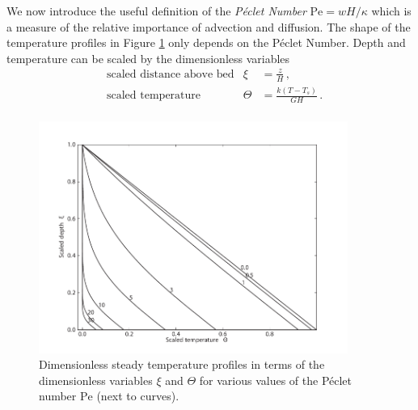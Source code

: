 \documentclass[parskip=half]{scrartcl}
\begin{document}
We now introduce the useful definition of the \emph{P{\'e}clet Number} $\text{Pe}
= w H/\kappa$ which is a measure of the relative importance of advection
and diffusion.  The shape of the temperature profiles in Figure
\ref{fig:advection-diffusion} only depends on the P{\'e}clet Number.  Depth and
temperature can be scaled by the dimensionless variables
%
\begin{align*}
 &\text{scaled distance above bed} & \xi &= \frac{z}{H}\,,\\
 &\text{scaled temperature}        & \Theta &= \frac{k (T-T_s)}{G H}\,.\\
\end{align*}
%
\begin{figure}[tbhp]
 \centering
 \includegraphics[width=0.9\textwidth]{figures/advection-diffusion}
  \caption{Dimensionless steady temperature profiles in terms of the
    dimensionless variables $\xi$ and $\Theta$ for various values of the
    P{\'e}clet number $\mathrm{Pe}$ (next to curves). }
   \label{fig:advection-diffusion}
\end{figure}


\newpage

\end{document}
